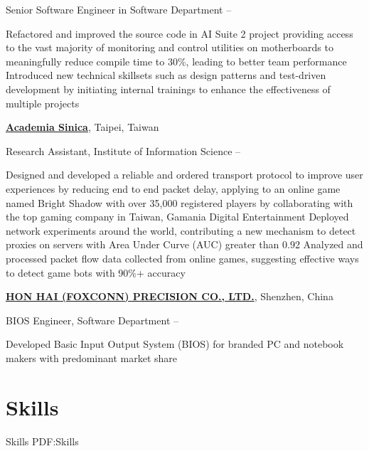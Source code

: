 \documentclass[a4paper,10pt,oneside]{article}
\begin{document}
\begin{body}
\par
Senior Software Engineer in Software Department
\hfill
{} --
\begin{detail}
\BulletItem
Refactored and improved the source code in AI Suite 2 project providing access to the vast majority of monitoring and control utilities on motherboards to meaningfully reduce compile time to 30\%, leading to better team performance
\BulletItem
Introduced new technical skillsets such as design patterns and test-driven development by initiating internal trainings to enhance the effectiveness of multiple projects
\end{detail}

\EntryGap
\href{http://www.iis.sinica.edu.tw/index_en.html}
{\textbf{Academia Sinica}}, Taipei, Taiwan
\par
Research Assistant, Institute of Information Science
\hfill
{} --
\begin{detail}
\BulletItem
Designed and developed a reliable and ordered transport protocol to improve user experiences by reducing end to end packet delay, applying to an online game named Bright Shadow with over 35,000 registered players by collaborating with the top gaming company in Taiwan, Gamania Digital Entertainment
\BulletItem
Deployed network experiments around the world, contributing a new mechanism to detect proxies on servers with Area Under Curve (AUC) greater than 0.92
\BulletItem
Analyzed and processed packet flow data collected from online games, suggesting effective ways to detect game bots with 90\%+ accuracy
\end{detail}

\EntryGap
\href{http://www.foxconn.com.tw/}
{\textbf{HON HAI (FOXCONN) PRECISION CO., LTD.}}, Shenzhen, China
\par
BIOS Engineer, Software Department
\hfill
{} --
\begin{detail}
\BulletItem
Developed Basic Input Output System (BIOS) for branded PC and notebook makers with predominant market share
\end{detail}


\section{Skills}
{Skills}
{PDF:Skills}


\end{body}
\end{document}
